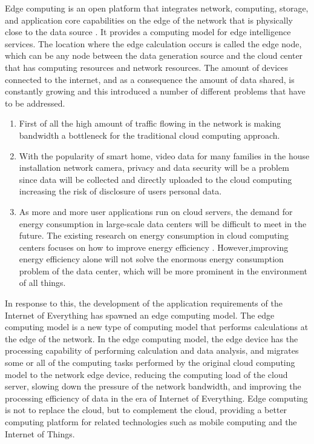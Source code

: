 Edge computing \cite{Edge} is an open platform that integrates network, computing, storage, and application core
capabilities on the edge of the network that is physically close to the data source \cite{Edge2}. It provides
a computing model for edge intelligence services. The location where the edge calculation occurs is 
called the edge node, which can be any node between the data generation source and the cloud center
that has computing resources and network resources. The amount of devices connected to the 
internet, and as a consequence the amount of data shared, is constantly \cite{DataGrowth} growing and this introduced 
a number of different problems that have to be addressed. 
\\
\begin{enumerate}
    \item First of all the high amount of traffic flowing in the network is making bandwidth a
            bottleneck for the traditional cloud computing approach. 

    \item With the popularity of smart home, video data for many families in the house installation
            network camera, privacy and data security will be a problem since data will be collected
            and directly uploaded to the cloud computing increasing the risk of disclosure of users 
            personal data.

    \item As more and more user applications run on cloud servers, the demand for energy consumption
            in large-scale data centers will be difficult to meet in the future. The existing research on
            energy consumption in cloud computing centers focuses on how to improve energy efficiency \cite{EnEff}.
            However,improving energy efficiency alone will not solve the enormous energy consumption 
            problem of the data center, which will be more prominent in the environment of all things.
\end{enumerate}

In response to this, the development of the application requirements of the Internet of Everything has 
spawned an edge computing model. The edge computing model is a new type of computing model that performs
calculations at the edge of the network. In the edge computing model, the edge device has the processing
capability of performing calculation and data analysis, and migrates some or all of the computing tasks
performed by the original cloud computing model to the network edge device, reducing the computing load
of the cloud server, slowing down the pressure of the network bandwidth, and improving the processing 
efficiency of data in the era of Internet of Everything. Edge computing is not to replace the cloud, 
but to complement the cloud, providing a better computing platform for related technologies such as mobile
computing and the Internet of Things.


